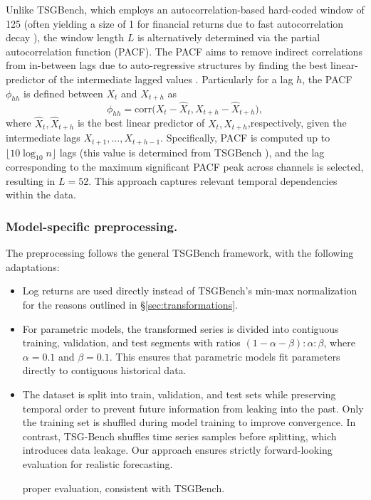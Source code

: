 \documentclass[sigconf]{acmart}
\begin{document}
      Unlike TSGBench, which employs an 
        autocorrelation-based hard-coded window of 125 (often 
        yielding a size of 1 for financial returns due to fast 
        autocorrelation decay \cite{Takahashi24,Cont01}), the window
        length \(L\) is alternatively
        determined via the partial autocorrelation function (PACF).
        The PACF aims to remove indirect correlations from in-between
        lags due to auto-regressive structures by finding the 
        best linear-predictor of the intermediate lagged values
        \cite{Durbin60}. Particularly for a lag \(h\), the PACF
        \(\phi_{hh}\) is defined between \( X_t \) and \( X_{t+h}\) as
        \begin{equation*}
        \phi_{hh} = \text{corr}\bigl(X_t - \hat{X}_t, X_{t+h} - \hat{X}_{t+h}\bigr),
        \end{equation*}
        where \(\hat{X}_t, \hat{X}_{t+h}\) is the best linear 
        predictor of \(X_t, X_{t+h}\),respectively, given the
        intermediate lags \(X_{t+1}, \ldots, X_{t+h-1}\).
        Specifically, PACF is computed up to 
        \(\lfloor 10\log_{10} n \rfloor\) lags (this value is determined
        from TSGBench \cite{Ang23}), and the lag 
        corresponding to the maximum significant PACF peak across 
        channels is selected, resulting in \(L=52\). This approach 
        captures relevant temporal dependencies within the data.

    \subsubsection{Model-specific preprocessing.}\label{sec:model-specific}
    The preprocessing follows the general TSGBench framework,
    with the following adaptations:

    \begin{itemize}
        \item Log returns are used directly instead of TSGBench's 
        min-max normalization for the reasons outlined in 
        §\ref{sec:transformations}. 
        \item For parametric models, the transformed series is 
        divided into contiguous training, validation, and test 
        segments with ratios \((1-\alpha-\beta):\alpha:\beta\), 
        where \(\alpha=0.1\) and \(\beta=0.1\). This ensures that 
        parametric models fit parameters directly to contiguous 
        historical data.
  
        \item The dataset is split into train, validation, and test 
        sets while preserving temporal order to prevent future 
        information from leaking into the past. Only the training 
        set is shuffled during model training to improve 
        convergence. In contrast, TSG-Bench shuffles time series 
        samples before splitting, which introduces data leakage. 
        Our approach ensures strictly forward-looking evaluation 
        for realistic forecasting.

        proper evaluation, consistent with TSGBench.
    \end{itemize}
\end{document}
